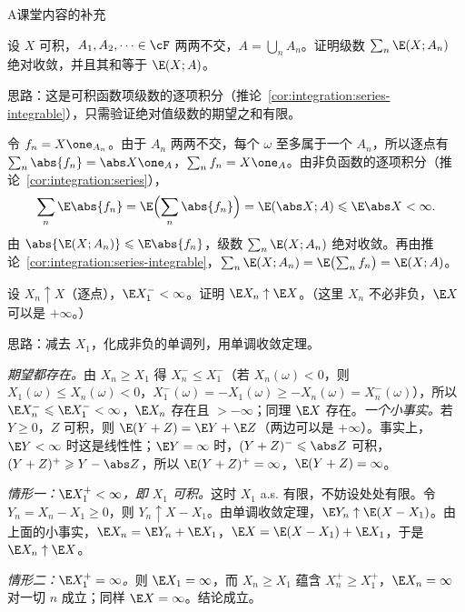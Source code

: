 \begin{exercises}{A}{课堂内容的补充}
\item\label{ex:expectation:A1} 设 $X$ 可积，$A_1,A_2,\dots\in\cF$ 两两不交，$A=\bigcup_nA_n$。证明级数 $\sum_n\E(X;A_n)$ 绝对收敛，并且其和等于 $\E(X;A)$。
\begin{solution}
思路：这是可积函数项级数的逐项积分（推论~\ref{cor:integration:series-integrable}），只需验证绝对值级数的期望之和有限。

令 $f_n=X\one_{A_n}$。由于 $A_n$ 两两不交，每个 $\omega$ 至多属于一个 $A_n$，所以逐点有 $\sum_n\abs{f_n}=\abs X\one_A$，$\sum_nf_n=X\one_A$。由非负函数的逐项积分（推论~\ref{cor:integration:series}），
\[
\sum_n\E\abs{f_n}=\E\Bigl(\sum_n\abs{f_n}\Bigr)=\E(\abs X;A)\leqslant \E\abs X<\infty .
\]
由 $\abs{\E(X;A_n)}\leqslant \E\abs{f_n}$，级数 $\sum_n\E(X;A_n)$ 绝对收敛。再由推论~\ref{cor:integration:series-integrable}，$\sum_n\E(X;A_n)=\E\bigl(\sum_nf_n\bigr)=\E(X;A)$。
\end{solution}

\item\label{ex:expectation:A2} 设 $X_n\uparrow X$（逐点），$\E X_1^-<\infty$。证明 $\E X_n\uparrow \E X$。（这里 $X_n$ 不必非负，$\E X$ 可以是 $+\infty$。）
\begin{solution}
思路：减去 $X_1$，化成非负的单调列，用单调收敛定理。

\emph{期望都存在。}由 $X_n\geqslant X_1$ 得 $X_n^-\leqslant X_1^-$（若 $X_n(\omega)<0$，则 $X_1(\omega)\leqslant X_n(\omega)<0$，$X_1^-(\omega)=-X_1(\omega)\geqslant-X_n(\omega)=X_n^-(\omega)$），所以 $\E X_n^-\leqslant \E X_1^-<\infty$，$\E X_n$ 存在且 $>-\infty$；同理 $\E X$ 存在。\emph{一个小事实。}若 $Y\geqslant0$，$Z$ 可积，则 $\E(Y+Z)=\E Y+\E Z$（两边可以是 $+\infty$）。事实上，$\E Y<\infty$ 时这是线性性；$\E Y=\infty$ 时，$(Y+Z)^-\leqslant\abs Z$ 可积，$(Y+Z)^+\geqslant Y-\abs Z$，所以 $\E(Y+Z)^+=\infty$，$\E(Y+Z)=\infty$。

\emph{情形一：$\E X_1^+<\infty$，即 $X_1$ 可积。}这时 $X_1$ a.s. 有限，不妨设处处有限。令 $Y_n=X_n-X_1\geqslant0$，则 $Y_n\uparrow X-X_1$。由单调收敛定理，$\E Y_n\uparrow \E(X-X_1)$。由上面的小事实，$\E X_n=\E Y_n+\E X_1$，$\E X=\E(X-X_1)+\E X_1$，于是 $\E X_n\uparrow \E X$。

\emph{情形二：$\E X_1^+=\infty$。}则 $\E X_1=\infty$，而 $X_n\geqslant X_1$ 蕴含 $X_n^+\geqslant X_1^+$，$\E X_n=\infty$ 对一切 $n$ 成立；同样 $\E X=\infty$。结论成立。
\end{solution}


\end{exercises}
